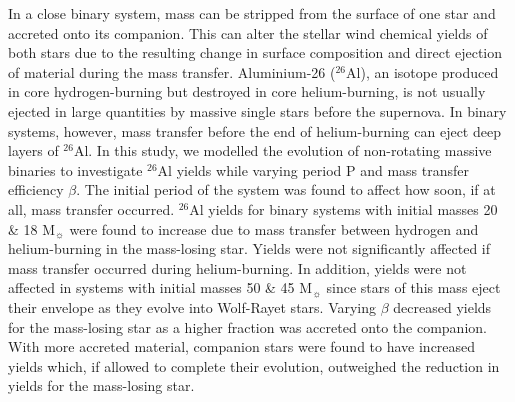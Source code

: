 In a close binary system, mass can be stripped from the surface of one star and accreted onto its companion.
This can alter the stellar wind chemical yields of both stars due to the resulting change in surface composition and direct ejection of material during the mass transfer.
Aluminium-26 ($^{26}$Al), an isotope produced in core hydrogen-burning but destroyed in core helium-burning, is not usually ejected in large quantities by massive single stars before the supernova.
In binary systems, however, mass transfer before the end of helium-burning can eject deep layers of $^{26}$Al.
In this study, we modelled the evolution of non-rotating massive binaries to investigate $^{26}$Al yields while varying period P and mass transfer efficiency $\beta$.
The initial period of the system was found to affect how soon, if at all, mass transfer occurred.
$^{26}$Al yields for binary systems with initial masses 20 \& 18 M$_{\sun}$ were found to increase due to mass transfer between hydrogen and helium-burning in the mass-losing star. Yields were not significantly affected if mass transfer occurred during helium-burning.
In addition, yields were not affected in systems with initial masses 50 \& 45 M$_{\sun}$ since stars of this mass eject their envelope as they evolve into Wolf-Rayet stars.
Varying $\beta$ decreased yields for the mass-losing star as a higher fraction was accreted onto the companion.
With more accreted material, companion stars were found to have increased yields which, if allowed to complete their evolution, outweighed the reduction in yields for the mass-losing star.